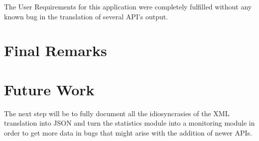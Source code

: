 \documentclass[twocolumn,twoside,10pt,a4paper]{article}
\begin{document}
The User Requirements for this application were completely fulfilled without any known bug in the translation of several API's output.

\section{Final Remarks}\label{sec:final-remarks}


\section{Future Work}\label{sec:future-work}

The next step will be to fully document all the idiosyncrasies of the XML translation into JSON and turn the statistics module into a monitoring module in order to get more data in bugs that might arise with the addition of newer APIs.

\renewcommand{\bibname}{References}


\end{document}
